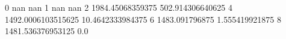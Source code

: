 0 nan nan
1 nan nan
2 1984.45068359375 502.914306640625
4 1492.0006103515625 10.4642333984375
6 1483.091796875 1.555419921875
8 1481.536376953125 0.0
